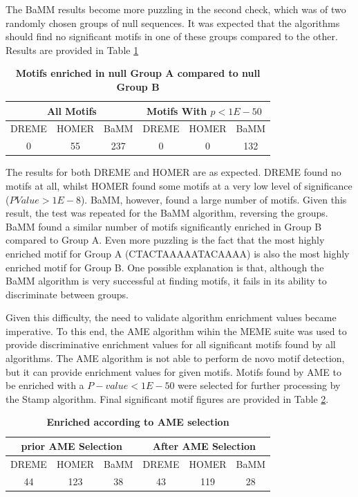 \documentclass[12pt]{article}
\begin{document}
The BaMM results become more puzzling in the second check, which was of two randomly chosen groups of null sequences. It was expected that the algorithms should find no significant motifs in one of these groups compared to the other.
Results are provided in Table \ref{nullHalfGroups}

\begin{table}[!htbp]
\caption{\bf{Motifs enriched in null Group A compared to null Group B}}
\label{nullHalfGroups}
\centering
\begin{tabular}{|c|c|c||c|c|c|}
\hline
\multicolumn{3}{|c||}{All Motifs} & \multicolumn{3}{|c|}{Motifs With $p<1E-50$}\\
\hline
DREME & HOMER & BaMM & DREME & HOMER & BaMM\\
\hline
\hline
0 & 55 & 237 & 0 & 0 & 132\\
\hline
\end{tabular}
\end{table}

The results for both DREME and HOMER are as expected. DREME found no motifs at all, whilst HOMER found some motifs at a very low level of significance ($PValue>1E-8$). BaMM, however, found a large number of motifs. Given this result, the test was repeated for the BaMM algorithm, reversing the groups. BaMM found a similar number of motifs significantly enriched in Group B compared to Group A. Even more puzzling is the fact that the most highly enriched motif for Group A (CTACTAAAAATACAAAA) is also the most highly enriched motif for Group B. One possible explanation is that, although the BaMM algorithm is very successful at finding motifs, it fails in its ability to discriminate between groups. 

Given this difficulty, the need to validate algorithm enrichment values became imperative. To this end, the AME algorithm \citep{Buske2010} wihin the MEME suite  was used to provide discriminative enrichment values for all significant motifs found by all algorithms. The AME algorithm is not able to perform de novo motif detection, but it can provide enrichment values for given motifs. Motifs found by AME to be enriched with a $P-value<1E-50$ were selected for further processing by the Stamp algorithm. Final significant motif figures are provided in Table \ref{ameResults}.

\begin{table}[!htbp]
\caption{\bf{Enriched according to AME selection}}
\label{ameResults}
\centering
\begin{tabular}{|c|c|c||c|c|c|}
\hline
\multicolumn{3}{|c||}{prior AME Selection} & \multicolumn{3}{|c|}{After AME Selection}\\
\hline
DREME & HOMER & BaMM & DREME & HOMER & BaMM\\
\hline
\hline
44 & 123 & 38 & 43 & 119 & 28\\
\hline
\end{tabular}
\end{table}
\end{document}
